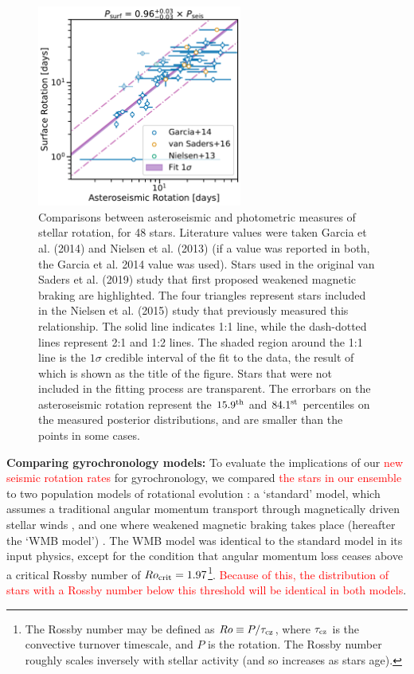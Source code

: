 \documentclass[12pt]{article}
\newcommand{\rtwo}[1]{\textcolor{red}{{#1}}}
\begin{document}
\begin{figure}[h!]
	\centering
	\includegraphics[width=0.6\textwidth]{Images/surf-seis-comparison_update.pdf}
	\caption{Comparisons between asteroseismic and photometric measures of stellar rotation, for 48 stars. Literature values were taken Garcia et al. (2014) \cite{garcia+2014} and Nielsen et al. (2013) \cite{nielsen+2013} (if a value was reported in both, the Garcia et al. 2014 value was used). Stars used in the original van Saders et al. (2019) \cite{vansaders+2016} study that first proposed weakened magnetic braking are highlighted. The four triangles represent stars included in the Nielsen et al. (2015) study \cite{nielsen+2015} that previously measured this relationship. The solid line indicates 1:1 line, while the dash-dotted lines represent 2:1 and 1:2 lines. The shaded region around the 1:1 line is the $1\sigma$ credible interval of the fit to the data, the result of which is shown as the title of the figure. Stars that were not included in the fitting process are transparent. The errorbars on the asteroseismic rotation represent the $15.9^{\rm th}$ and $84.1^{\rm st}$ percentiles on the measured posterior distributions, and are smaller than the points in some cases.}
	\label{fig:protlit}
\end{figure}

\textbf{Comparing gyrochronology models:} To evaluate the implications of our \rtwo{new seismic rotation rates} for gyrochronology, we compared \rtwo{the stars in our ensemble} to two population models of rotational evolution \cite{vansaders+2019}: a `standard' model, which assumes a traditional angular momentum transport through magnetically driven stellar winds \cite{vansaders+2016,skumanich1972, kawaler1988}, and one where weakened magnetic braking takes place (hereafter the `WMB model') \cite{vansaders+2016}.  The WMB model was identical to the standard model in its input physics, except for the condition that angular momentum loss ceases above a critical Rossby number of $Ro_{\rm crit} = 1.97$\footnote{The Rossby number may be defined as $Ro \equiv P/\tau_{\rm cz}$, where $\tau_{\rm cz}$ is the convective turnover timescale, and $P$ is the rotation. The Rossby number roughly scales inversely with stellar activity (and so increases as stars age).}. \rtwo{Because of this, the distribution of stars with a Rossby number below this threshold will be identical in both models}.
\end{document}
